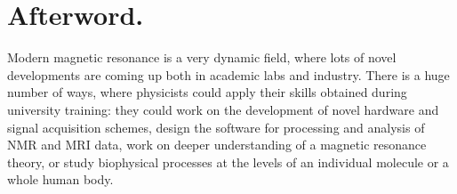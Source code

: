 \documentclass[a4paper, 12pt]{article}
\begin{document}
\section{Afterword.}
 Modern magnetic resonance is a very dynamic field, where lots of novel developments are coming up both in academic labs and industry. There is a huge number of ways, where physicists could apply their skills obtained during university training: they could work on the development of novel hardware and signal acquisition schemes, design the software for processing and analysis of NMR and MRI data, work on deeper understanding of a magnetic resonance theory, or study biophysical processes at the levels of an individual molecule or a whole human body.
\end{document}
